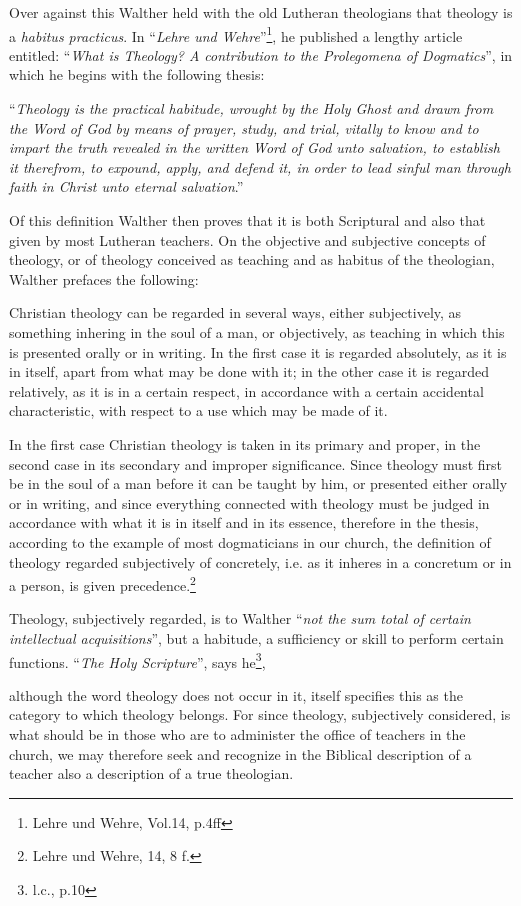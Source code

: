 Over against this Walther held with the old Lutheran theologians that theology is a \textit{habitus practicus}.  In “\textit{Lehre und Wehre}”\footnote{Lehre und Wehre, Vol.14, p.4ff}, he published a lengthy article entitled: “\textit{What is Theology?  A contribution to the Prolegomena of  Dogmatics}”, in which he begins with the following thesis: \begin{displayquote}“\textit{Theology is the practical habitude, wrought by the Holy Ghost and drawn from the Word of God by means of prayer, study, and trial, vitally to know and to impart the truth revealed in the written Word of God unto salvation, to establish it therefrom, to expound, apply, and defend it, in order to lead sinful man through faith in Christ unto eternal salvation}.”\end{displayquote}

Of this definition Walther then proves that it is both Scriptural and also that given by most Lutheran teachers.  On the objective and subjective concepts of theology, or of theology conceived as teaching and as habitus of the theologian, Walther prefaces the following:

\begin{fancyquotes}Christian theology can be regarded in several ways, either subjectively, as something inhering in the soul of a man, or objectively, as teaching in which this is presented orally or in writing.  In the first case it is regarded absolutely, as it is in itself, apart from what may be done with it; in the other case it is regarded relatively, as it is in a certain respect, in accordance with a certain accidental characteristic, with respect to a use which may be made of it. \par In the first case Christian theology is taken in its primary and proper, in the second case in its secondary and improper significance.  Since theology must first be in the soul of a man before it can be taught by him, or presented either orally or in writing, and since everything connected with theology must be judged in accordance with what it is in itself and in its essence, therefore in the thesis, according to the example of most dogmaticians in our church, the definition of theology regarded subjectively of concretely, i.e. as it inheres in a concretum or in a person, is given precedence.\footnote{ Lehre und Wehre, 14, 8 f.}\end{fancyquotes}

Theology, subjectively regarded, is to Walther “\textit{not the sum total of certain intellectual acquisitions}”, but a habitude, a sufficiency or skill to perform certain functions.  “\textit{The Holy Scripture}”, says he\footnote{l.c., p.10},\begin{fancyquotes}although the word theology does not occur in it, itself specifies this as the category to which theology belongs.  For since theology, subjectively considered, is what should be in those who are to administer the office of teachers in the church, we may therefore seek and recognize in the Biblical description of a teacher also a description of a true theologian.\end{fancyquotes}

